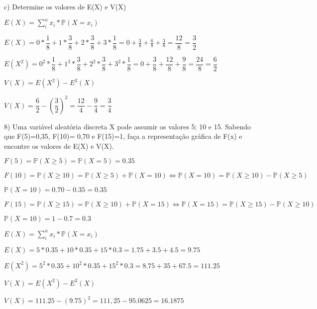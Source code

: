 \documentclass[12pt,a4paper]{article}
\begin{document}
\vspace{1cm}
c) Determine os valores de E(X) e V(X)

\begin{center}
	\vspace{0.25cm}
	$E(X) = \sum_{i}^{n} x_{i}*\mathbb{P}(X = x_{i})$
	
	\vspace{1cm}
	$E(X) = 0*\dfrac{1}{8}+1*\dfrac{3}{8}+2*\dfrac{3}{8} + 3*\dfrac{1}{8}= 0 + \frac{3}{8} + \frac{6}{8} + \frac{3}{8} = \dfrac{12}{8} = \dfrac{3}{2}$
	
	\vspace{0.5cm}
	$E(X^{2}) = 0^{2}*\dfrac{1}{8}+1^{2}*\dfrac{3}{8}+2^{2}*\dfrac{3}{8} + 3^{2}*\dfrac{1}{8} = 0 + \dfrac{3}{8} + \dfrac{12}{8} + \dfrac{9}{8} = \dfrac{24}{8} = \dfrac{6}{2}$
	
	\vspace{1cm}
	$V(X) = E(X^{2}) - E^{2}(X)$
	
	\vspace{1cm}
	$V(X) = \dfrac{6}{2}-(\dfrac{3}{2})^{2} = \dfrac{12}{4}-\dfrac{9}{4}= \dfrac{3}{4}$
\end{center}

\vspace{1cm}
8) Uma variável aleatória discreta X pode assumir os valores 5; 10 e 15. Sabendo que F(5)=0,35, F(10)= 0,70 e F(15)=1, faça a representação gráfica de F(x) e encontre os valores de E(X) e V(X).

\begin{center}
	\vspace{0.25cm}
	$F(5) = \mathbb{P}(X\geq5) = \mathbb{P}(X=5)=0.35$
	
	\vspace{1cm}
	$F(10) = \mathbb{P}(X\geq10) = \mathbb{P}(X\geq5) + \mathbb{P}(X = 10) \Leftrightarrow \mathbb{P}(X = 10) = \mathbb{P}(X\geq10) - \mathbb{P}(X\geq5)$
	
	\vspace{0.25cm}
	$ \mathbb{P}(X = 10) = 0.70 - 0.35 = 0.35$
	
	\vspace{1cm}
	$F(15) = \mathbb{P}(X\geq15) = \mathbb{P}(X\geq10) + \mathbb{P}(X = 15) \Leftrightarrow \mathbb{P}(X = 15) = \mathbb{P}(X\geq15) - \mathbb{P}(X\geq10)$
	
	\vspace{0.25cm}
	$ \mathbb{P}(X = 10) = 1 - 0.7 = 0.3$
	
	\vspace{1.5cm}
	$E(X) = \sum_{i}^{n} x_{i}*\mathbb{P}(X = x_{i})$
	
	\vspace{1cm}
	$E(X) = 5*0.35+10*0.35+15*0.3= 1.75 + 3.5 + 4.5 = 9.75$
	
	\vspace{0.5cm}
	$E(X^{2}) = 5^{2}*0.35+10^{2}*0.35+15^{2}*0.3 = 8.75 + 35 + 67.5 = 111.25$
	
	\vspace{1cm}
	$V(X) = E(X^{2}) - E^{2}(X)$
	
	\vspace{1cm}
	$V(X) = 111.25-(9.75)^{2} = 111,25-95.0625 = 16.1875$
\end{center}
\end{document}
